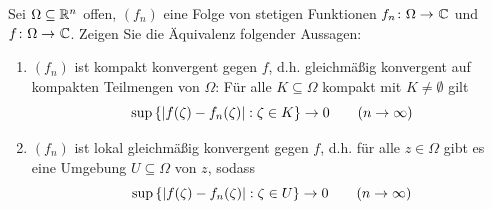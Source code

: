 \begin{exercisePage}
	
	\begin{task}
		Sei $\Omega \subseteq \mathbb{R}^n$ offen, $(f_n)$ eine Folge von stetigen Funktionen $\abb{f_n}{\Omega}{\CC}$ und $\abb{f}{\Omega}{\CC}$. Zeigen Sie die Äquivalenz folgender Aussagen:
		\begin{enumerate}[label=(\roman*), leftmargin=*, nolistsep]
			\item $(f_n)$ ist kompakt konvergent gegen $f$, d.h. gleichmäßig konvergent auf kompakten Teilmengen von $\Omega$: Für alle $K \subseteq \Omega$ kompakt mit $K \neq \emptyset$ gilt
			\begin{equation*}
				\sup\left\{ \left| f(\zeta) - f_n(\zeta) \right| : \zeta \in K \right\} \to 0 \qquad (n \to \infty)
			\end{equation*}
			\item $(f_n)$ ist lokal gleichmäßig konvergent gegen $f$, d.h. für alle $z \in \Omega$ gibt es eine Umgebung $U \subseteq \Omega$ von $z$, sodass
			\begin{equation*}
				\sup\left\{ \left| f(\zeta) - f_n(\zeta) \right| : \zeta \in U \right\} \to 0 \qquad (n \to \infty)
			\end{equation*}
		\end{enumerate}
	\end{task}
	

\end{exercisePage}
